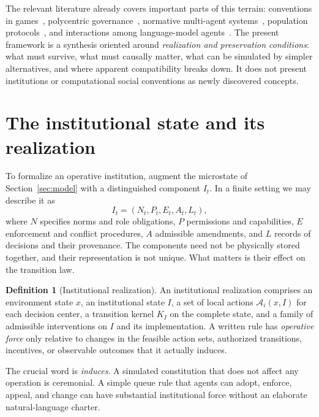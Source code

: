 \documentclass[11pt,letterpaper]{article}
\theoremstyle{plain}
\theoremstyle{definition}
\newtheorem{definition}[proposition]{Definition}
\theoremstyle{remark}
\begin{document}
The relevant literature already covers important parts of this terrain: conventions in games~\cite{young,shoham}, polycentric governance~\cite{ostrom,ostrombook}, normative multi-agent systems~\cite{boella,grossinorm}, population protocols~\cite{angluin}, and interactions among language-model agents~\cite{park,ashery}. The present framework is a synthesis oriented around \emph{realization and preservation conditions}: what must survive, what must causally matter, what can be simulated by simpler alternatives, and where apparent compatibility breaks down. It does not present institutions or computational social conventions as newly discovered concepts.

\section{The institutional state and its realization}\label{sec:institutional-state}

To formalize an operative institution, augment the microstate of Section~\ref{sec:model} with a distinguished component $I_t$. In a finite setting we may describe it as
\begin{equation}\label{eq:institutional-state}
I_t=(N_t,P_t,E_t,A_t,L_t),
\end{equation}
where $N$ specifies norms and role obligations, $P$ permissions and capabilities, $E$ enforcement and conflict procedures, $A$ admissible amendments, and $L$ records of decisions and their provenance. The components need not be physically stored together, and their representation is not unique. What matters is their effect on the transition law.

\begin{definition}[Institutional realization]\label{def:institutional-realization}
An institutional realization comprises an environment state $x$, an institutional state $I$, a set of local actions $\mathcal A_i(x,I)$ for each decision center, a transition kernel $K_I$ on the complete state, and a family of admissible interventions on $I$ and its implementation. A written rule has \emph{operative force} only relative to changes in the feasible action sets, authorized transitions, incentives, or observable outcomes that it actually induces.
\end{definition}

The crucial word is \emph{induces}. A simulated constitution that does not affect any operation is ceremonial. A simple queue rule that agents can adopt, enforce, appeal, and change can have substantial institutional force without an elaborate natural-language charter.
\end{document}
